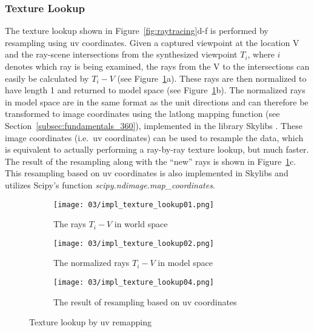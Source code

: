 \subsubsection{Texture Lookup}
The texture lookup shown in Figure~\ref{fig:raytracing}d-f is performed by resampling using uv coordinates. Given a captured viewpoint at the location V and the ray-scene intersections from the synthesized viewpoint $T_i$, where $i$ denotes which ray is being examined, the rays from the V to the intersections can easily be calculated by $T_i-V$ (see Figure~\ref{fig:impl_texture_lookup}a). These rays are then normalized to have length 1 and returned to model space (see Figure~\ref{fig:impl_texture_lookup}b). The normalized rays in model space are in the same format as the unit directions and can therefore be transformed to image coordinates using the latlong mapping function (see Section~\ref{subsec:fundamentals_360}), implemented in the library Skylibs \cite{skylibs}. These image coordinates (i.e.\ uv coordinates) can be used to resample the data, which is equivalent to actually performing a ray-by-ray texture lookup, but much faster. The result of the resampling along with the ``new'' rays is shown in Figure~\ref{fig:impl_texture_lookup}c. This resampling based on uv coordinates is also implemented in Skylibs and utilizes Scipy's function \emph{scipy.ndimage.map\_coordinates}.

\begin{figure}
\centering
    \hfill
    \begin{subfigure}[t]{0.3\textwidth}
            \centering
            \texttt{[image: 03/impl\_texture\_lookup01.png]}
            \caption{The rays $T_i-V$ in world space}
    \end{subfigure}%
    \hfill
    \begin{subfigure}[t]{0.3\textwidth}
            \centering
            \texttt{[image: 03/impl\_texture\_lookup02.png]}
            \caption{The normalized rays $T_i-V$ in model space}
    \end{subfigure}
    \hfill
    \begin{subfigure}[t]{0.3\textwidth}
            \centering
            \texttt{[image: 03/impl\_texture\_lookup04.png]}
            \caption{The result of resampling based on uv coordinates}
    \end{subfigure}%
    \hfill
  \caption{Texture lookup by uv remapping} \label{fig:impl_texture_lookup}
\end{figure}

